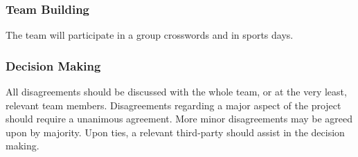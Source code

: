 \documentclass{article}
\begin{document}
\subsubsection*{Team Building}
The team will participate in a group crosswords and in sports days.

\subsubsection*{Decision Making} 

All disagreements should be discussed with the whole team, or at the very least, relevant team members.
Disagreements regarding a major aspect of the project should require a unanimous agreement.
More minor disagreements may be agreed upon by majority.
Upon ties, a relevant third-party should assist in the decision making.
\end{document}
